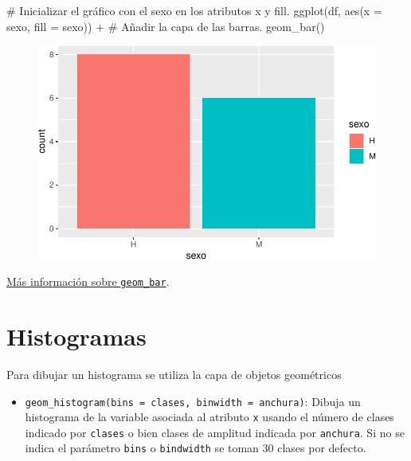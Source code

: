 \documentclass[
  a4paper,
]{scrreport}
\newenvironment{Shaded}{\begin{snugshade}}{\end{snugshade}}
\newcommand{\AttributeTok}[1]{\textcolor[rgb]{0.40,0.45,0.13}{#1}}
\newcommand{\CommentTok}[1]{\textcolor[rgb]{0.37,0.37,0.37}{#1}}
\newcommand{\FunctionTok}[1]{\textcolor[rgb]{0.28,0.35,0.67}{#1}}
\newcommand{\NormalTok}[1]{\textcolor[rgb]{0.00,0.23,0.31}{#1}}
\newcommand{\SpecialCharTok}[1]{\textcolor[rgb]{0.37,0.37,0.37}{#1}}
\providecommand{\tightlist}{%
  \setlength{\itemsep}{0pt}\setlength{\parskip}{0pt}}\usepackage{longtable,booktabs,array}
\theoremstyle{definition}
\theoremstyle{definition}
\theoremstyle{remark}
\begin{document}
\begin{Shaded}
\begin{Highlighting}[]
\CommentTok{\# Inicializar el gráfico con el sexo en los atributos x y fill.}
\FunctionTok{ggplot}\NormalTok{(df, }\FunctionTok{aes}\NormalTok{(}\AttributeTok{x =}\NormalTok{ sexo, }\AttributeTok{fill =}\NormalTok{ sexo)) }\SpecialCharTok{+}
\CommentTok{\# Añadir la capa de las barras.}
    \FunctionTok{geom\_bar}\NormalTok{() }
\end{Highlighting}
\end{Shaded}

\begin{figure}[H]

{\centering \includegraphics{./07-graficos_files/figure-pdf/unnamed-chunk-14-1.pdf}

}

\end{figure}

\href{https://ggplot2.tidyverse.org/reference/geom_bar.html}{Más
información sobre \texttt{geom\_bar}}.

\hypertarget{histogramas}{%
\section{Histogramas}\label{histogramas}}

Para dibujar un histograma se utiliza la capa de objetos geométricos

\begin{itemize}
\tightlist
\item
  \texttt{geom\_histogram(bins\ =\ clases,\ binwidth\ =\ anchura)}:
  Dibuja un histograma de la variable asociada al atributo \texttt{x}
  usando el número de clases indicado por \texttt{clases} o bien clases
  de amplitud indicada por \texttt{anchura}. Si no se indica el
  parámetro \texttt{bins} o \texttt{bindwidth} se toman 30 clases por
  defecto.
\end{itemize}
\end{document}
